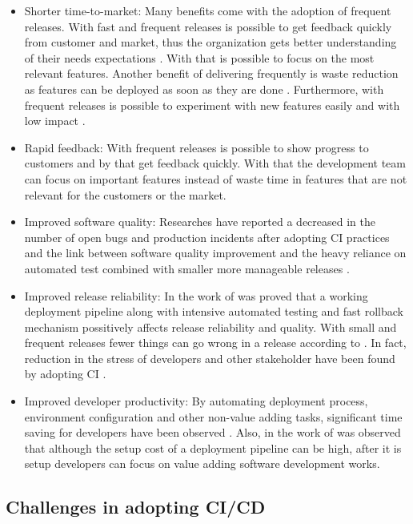 \begin{itemize}
\item Shorter time-to-market: Many benefits come with the adoption of frequent releases. With fast and frequent releases is possible to get feedback quickly from customer and market, thus the organization gets better understanding of their needs expectations \cite{Neely2013}. With that is possible to focus on the most relevant features. Another benefit of delivering frequently is waste reduction as features can be deployed as soon as they are done \cite{Leppanen2015}. Furthermore, with frequent releases is possible to experiment with new features easily and with low impact \cite{Neely2013}.
\item Rapid feedback: With frequent releases is possible to show progress to customers and by that get feedback quickly. With that the development team can focus on important features instead of waste time in features that are not relevant for the customers or the market.
\item Improved software quality: Researches have reported a decreased in the number of open bugs and production incidents after adopting CI practices \cite{Mantyla2015} and the link between software quality improvement and the heavy reliance on automated test combined with smaller more manageable releases \cite{Leppanen2015}.
\item Improved release reliability: In the work of \cite{Neely2013} was proved that a working deployment pipeline along with intensive automated testing and fast rollback mechanism possitively affects release reliability and quality. With small and frequent releases fewer things can go wrong in a release according to \cite{Fowler2013}. In fact, reduction in the stress of developers and other stakeholder have been found by adopting CI \cite{Neely2013} \cite{Chen2015}.
\item Improved developer productivity: By automating deployment process, environment configuration and other non-value adding tasks, significant time saving for developers have been observed \cite{Rodriguez2016}. Also, in the work of \cite{Humble2010} was observed that although the setup cost of a deployment pipeline can be high, after it is setup developers can focus on value adding software development works.
\end{itemize}

\subsection{Challenges in adopting CI/CD}
\label{ci-challenges}

